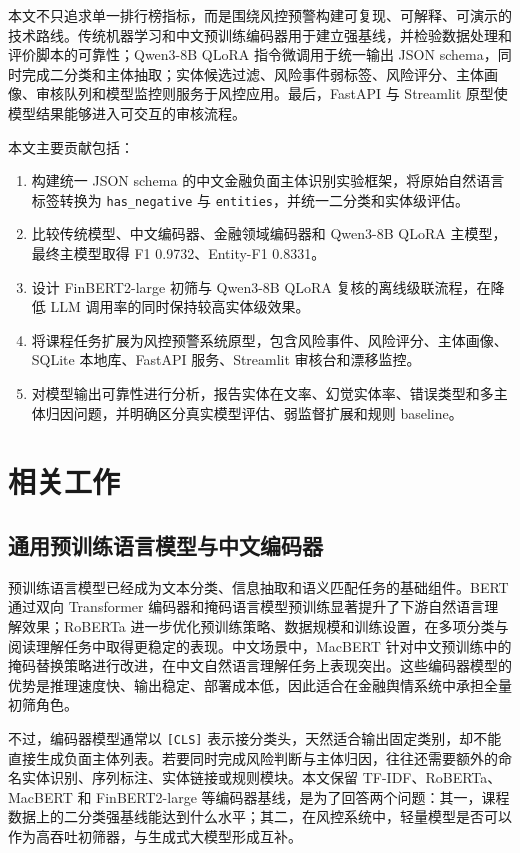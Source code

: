 \documentclass[UTF8,a4paper,12pt]{ctexart}
\begin{document}
本文不只追求单一排行榜指标，而是围绕风控预警构建可复现、可解释、可演示的技术路线。传统机器学习和中文预训练编码器用于建立强基线，并检验数据处理和评价脚本的可靠性；Qwen3-8B QLoRA 指令微调用于统一输出 JSON schema，同时完成二分类和主体抽取；实体候选过滤、风险事件弱标签、风险评分、主体画像、审核队列和模型监控则服务于风控应用。最后，FastAPI 与 Streamlit 原型使模型结果能够进入可交互的审核流程。

本文主要贡献包括：

\begin{enumerate}
  \item 构建统一 JSON schema 的中文金融负面主体识别实验框架，将原始自然语言标签转换为 \texttt{has\_negative} 与 \texttt{entities}，并统一二分类和实体级评估。
  \item 比较传统模型、中文编码器、金融领域编码器和 Qwen3-8B QLoRA 主模型，最终主模型取得 F1 0.9732、Entity-F1 0.8331。
  \item 设计 FinBERT2-large 初筛与 Qwen3-8B QLoRA 复核的离线级联流程，在降低 LLM 调用率的同时保持较高实体级效果。
  \item 将课程任务扩展为风控预警系统原型，包含风险事件、风险评分、主体画像、SQLite 本地库、FastAPI 服务、Streamlit 审核台和漂移监控。
  \item 对模型输出可靠性进行分析，报告实体在文率、幻觉实体率、错误类型和多主体归因问题，并明确区分真实模型评估、弱监督扩展和规则 baseline。
\end{enumerate}

\section{相关工作}

\subsection{通用预训练语言模型与中文编码器}

预训练语言模型已经成为文本分类、信息抽取和语义匹配任务的基础组件。BERT 通过双向 Transformer 编码器和掩码语言模型预训练显著提升了下游自然语言理解效果\cite{bert}；RoBERTa 进一步优化预训练策略、数据规模和训练设置，在多项分类与阅读理解任务中取得更稳定的表现\cite{roberta}。中文场景中，MacBERT 针对中文预训练中的掩码替换策略进行改进，在中文自然语言理解任务上表现突出\cite{macbert}。这些编码器模型的优势是推理速度快、输出稳定、部署成本低，因此适合在金融舆情系统中承担全量初筛角色。

不过，编码器模型通常以 \texttt{[CLS]} 表示接分类头，天然适合输出固定类别，却不能直接生成负面主体列表。若要同时完成风险判断与主体归因，往往还需要额外的命名实体识别、序列标注、实体链接或规则模块。本文保留 TF-IDF、RoBERTa、MacBERT 和 FinBERT2-large 等编码器基线，是为了回答两个问题：其一，课程数据上的二分类强基线能达到什么水平；其二，在风控系统中，轻量模型是否可以作为高吞吐初筛器，与生成式大模型形成互补。
\end{document}
